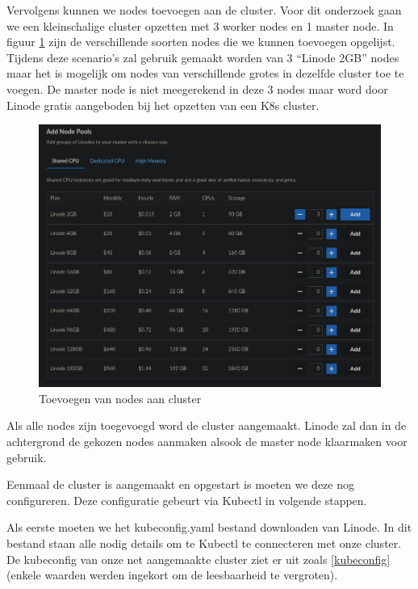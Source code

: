 Vervolgens kunnen we nodes toevoegen aan de cluster. Voor dit onderzoek gaan we een kleinschalige cluster opzetten met 3 worker nodes en 1 master node. In figuur \ref{fig:LinodeAddNodes} zijn de verschillende soorten nodes die we kunnen toevoegen opgelijst. Tijdens deze scenario's zal gebruik gemaakt worden van 3 ``Linode 2GB'' nodes maar het is mogelijk om nodes van verschillende grotes in dezelfde cluster toe te voegen. De master node is niet meegerekend in deze 3 nodes maar word door Linode gratis aangeboden bij het opzetten van een K8s cluster.

\begin{figure}[ht]
	\centering
	\includegraphics[width=\linewidth]{img/LinodeAddNodes.png}
	\caption{Toevoegen van nodes aan cluster}
	\label{fig:LinodeAddNodes}
\end{figure}

Als alle nodes zijn toegevoegd word de cluster aangemaakt. Linode zal dan in de achtergrond de gekozen nodes aanmaken alsook de master node klaarmaken voor gebruik. 

Eenmaal de cluster is aangemaakt en opgestart is moeten we deze nog configureren. Deze configuratie gebeurt via Kubectl in volgende stappen.

Als eerste moeten we het kubeconfig.yaml bestand downloaden van Linode. In dit bestand staan alle nodig details om te Kubectl te connecteren met onze cluster. De kubeconfig van onze net aangemaakte cluster ziet er uit zoals \ref{kubeconfig} (enkele waarden werden ingekort om de leesbaarheid te vergroten).

